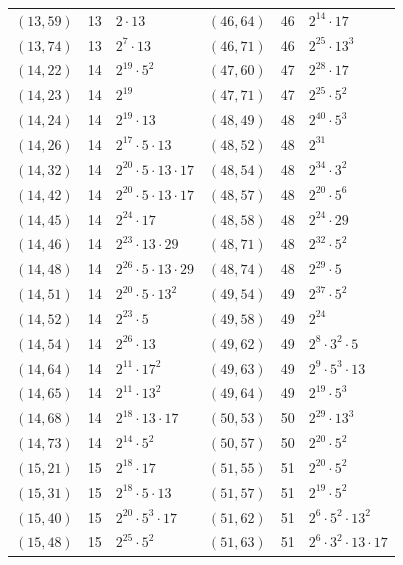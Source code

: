\documentclass[11pt]{article}
\begin{document}
\begin{longtable}{@{}lrl@{\qquad}lrl@{}}
$(13,59)$ & 13 & $2\cdot 13$ & $(46,64)$ & 46 & $2^{14}\cdot 17$\\
$(13,74)$ & 13 & $2^{7}\cdot 13$ & $(46,71)$ & 46 & $2^{25}\cdot 13^{3}$\\
$(14,22)$ & 14 & $2^{19}\cdot 5^{2}$ & $(47,60)$ & 47 & $2^{28}\cdot 17$\\
$(14,23)$ & 14 & $2^{19}$ & $(47,71)$ & 47 & $2^{25}\cdot 5^{2}$\\
$(14,24)$ & 14 & $2^{19}\cdot 13$ & $(48,49)$ & 48 & $2^{40}\cdot 5^{3}$\\
$(14,26)$ & 14 & $2^{17}\cdot 5\cdot 13$ & $(48,52)$ & 48 & $2^{31}$\\
$(14,32)$ & 14 & $2^{20}\cdot 5\cdot 13\cdot 17$ & $(48,54)$ & 48 & $2^{34}\cdot 3^{2}$\\
$(14,42)$ & 14 & $2^{20}\cdot 5\cdot 13\cdot 17$ & $(48,57)$ & 48 & $2^{20}\cdot 5^{6}$\\
$(14,45)$ & 14 & $2^{24}\cdot 17$ & $(48,58)$ & 48 & $2^{24}\cdot 29$\\
$(14,46)$ & 14 & $2^{23}\cdot 13\cdot 29$ & $(48,71)$ & 48 & $2^{32}\cdot 5^{2}$\\
$(14,48)$ & 14 & $2^{26}\cdot 5\cdot 13\cdot 29$ & $(48,74)$ & 48 & $2^{29}\cdot 5$\\
$(14,51)$ & 14 & $2^{20}\cdot 5\cdot 13^{2}$ & $(49,54)$ & 49 & $2^{37}\cdot 5^{2}$\\
$(14,52)$ & 14 & $2^{23}\cdot 5$ & $(49,58)$ & 49 & $2^{24}$\\
$(14,54)$ & 14 & $2^{26}\cdot 13$ & $(49,62)$ & 49 & $2^{8}\cdot 3^{2}\cdot 5$\\
$(14,64)$ & 14 & $2^{11}\cdot 17^{2}$ & $(49,63)$ & 49 & $2^{9}\cdot 5^{3}\cdot 13$\\
$(14,65)$ & 14 & $2^{11}\cdot 13^{2}$ & $(49,64)$ & 49 & $2^{19}\cdot 5^{3}$\\
$(14,68)$ & 14 & $2^{18}\cdot 13\cdot 17$ & $(50,53)$ & 50 & $2^{29}\cdot 13^{3}$\\
$(14,73)$ & 14 & $2^{14}\cdot 5^{2}$ & $(50,57)$ & 50 & $2^{20}\cdot 5^{2}$\\
$(15,21)$ & 15 & $2^{18}\cdot 17$ & $(51,55)$ & 51 & $2^{20}\cdot 5^{2}$\\
$(15,31)$ & 15 & $2^{18}\cdot 5\cdot 13$ & $(51,57)$ & 51 & $2^{19}\cdot 5^{2}$\\
$(15,40)$ & 15 & $2^{20}\cdot 5^{3}\cdot 17$ & $(51,62)$ & 51 & $2^{6}\cdot 5^{2}\cdot 13^{2}$\\
$(15,48)$ & 15 & $2^{25}\cdot 5^{2}$ & $(51,63)$ & 51 & $2^{6}\cdot 3^{2}\cdot 13\cdot 17$\\

\end{longtable}
\end{document}
